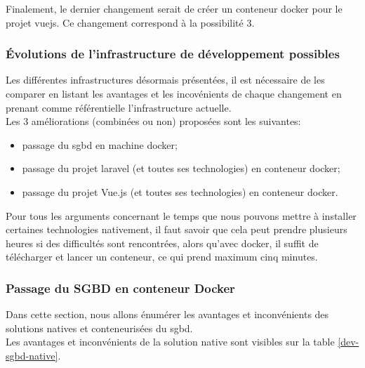 \documentclass[
    iai, %
    il, %
]{heig-tb}
\begin{document}
Finalement, le dernier changement serait de créer un \Gls{conteneur} \Gls{docker} pour le projet \Gls{vuejs}. Ce changement correspond à la possibilité 3.


\clearpage


\subsubsection{Évolutions de l'infrastructure de développement possibles}
Les différentes infrastructures désormais présentées, il est nécessaire de les comparer en listant les avantages et les incovénients de chaque changement en prenant comme référentielle l'infrastructure actuelle. \\
Les 3 améliorations (combinées ou non) proposées sont les suivantes:
\begin{itemize}
    \item passage du \Gls{sgbd} en machine \Gls{docker};
    \item passage du projet \Gls{laravel} (et toutes ses technologies) en \Gls{conteneur} \Gls{docker};
    \item passage du projet Vue.js (et toutes ses technologies) en \Gls{conteneur} \Gls{docker}.
\end{itemize}

Pour tous les arguments concernant le temps que nous pouvons mettre à installer certaines technologies nativement, il faut savoir que cela peut prendre plusieurs heures si des difficultés sont rencontrées, alors qu'avec \Gls{docker}, il suffit de télécharger et lancer un \Gls{conteneur}, ce qui prend maximum cinq minutes.

\subsubsection{Passage du SGBD en conteneur Docker}
Dans cette section, nous allons énumérer les avantages et inconvénients des solutions natives et conteneurisées du \Gls{sgbd}. \\
Les avantages et inconvénients de la solution native sont visibles sur la table \ref{dev-sgbd-native}.
\end{document}
